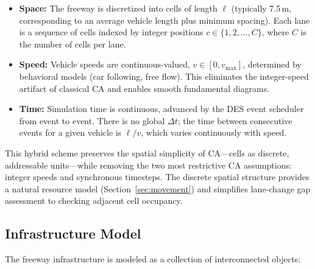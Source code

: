 \documentclass[review,authoryear]{elsarticle}
\begin{document}
\begin{itemize}
    \item \textbf{Space:} The freeway is discretized into cells of length $\ell$ (typically 7.5\,m, corresponding to an average vehicle length plus minimum spacing). Each lane is a sequence of cells indexed by integer positions $c \in \{1, 2, \ldots, C\}$, where $C$ is the number of cells per lane.

    \item \textbf{Speed:} Vehicle speeds are continuous-valued, $v \in [0, v_{\max}]$, determined by behavioral models (car following, free flow). This eliminates the integer-speed artifact of classical CA and enables smooth fundamental diagrams.

    \item \textbf{Time:} Simulation time is continuous, advanced by the DES event scheduler from event to event. There is no global $\Delta t$; the time between consecutive events for a given vehicle is $\ell / v$, which varies continuously with speed.
\end{itemize}

This hybrid scheme preserves the spatial simplicity of CA---cells as discrete, addressable units---while removing the two most restrictive CA assumptions: integer speeds and synchronous timesteps. The discrete spatial structure provides a natural resource model (Section~\ref{sec:movement}) and simplifies lane-change gap assessment to checking adjacent cell occupancy.

\subsection{Infrastructure Model}
\label{sec:infrastructure}

The freeway infrastructure is modeled as a collection of interconnected objects:
\end{document}
